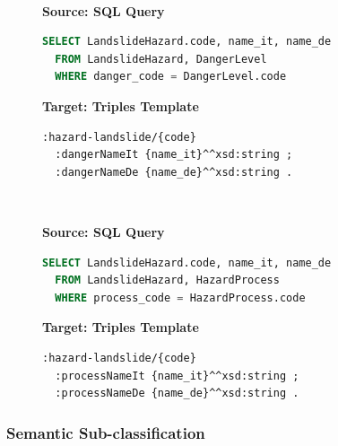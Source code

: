 \begin{figure}[ht!]
  \vspace*{-1mm}
  \textbf{\small{}} \\
  \begin{minipage}[t]{0.50\textwidth}
    \centering
    \textbf{\scriptsize Source: SQL Query}
\begin{lstlisting}[language=SQL]
SELECT LandslideHazard.code, name_it, name_de
  FROM LandslideHazard, DangerLevel
  WHERE danger_code = DangerLevel.code
\end{lstlisting}
  \end{minipage}
  \hfill
  \begin{minipage}[t]{0.50\textwidth}
    \centering
    \textbf{\scriptsize Target: Triples Template}
\begin{lstlisting}[language=Turtle]
:hazard-landslide/{code}
  :dangerNameIt {name_it}^^xsd:string ;
  :dangerNameDe {name_de}^^xsd:string . 
\end{lstlisting}
  \end{minipage}
  \vspace*{-4mm}
\end{figure}

\begin{figure}[ht!]
  \vspace*{-1mm}
  \textbf{\small{}} \\
  \begin{minipage}[t]{0.50\textwidth}
    \centering
    \textbf{\scriptsize Source: SQL Query}
\begin{lstlisting}[language=SQL]
SELECT LandslideHazard.code, name_it, name_de
  FROM LandslideHazard, HazardProcess
  WHERE process_code = HazardProcess.code
\end{lstlisting}
  \end{minipage}
  \hfill
  \begin{minipage}[t]{0.50\textwidth}
    \centering
    \textbf{\scriptsize Target: Triples Template}
\begin{lstlisting}[language=Turtle]
:hazard-landslide/{code}
  :processNameIt {name_it}^^xsd:string ;
  :processNameDe {name_de}^^xsd:string . 
\end{lstlisting}
  \end{minipage}
  \vspace*{-4mm}
\end{figure}


\subsubsection{Semantic Sub-classification}

